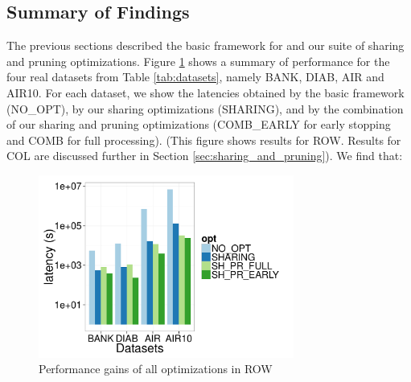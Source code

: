 \subsection{Summary of Findings}
\label{sec:expt_summary}

The previous sections described the basic framework for \SeeDB and our suite of sharing and pruning optimizations.
Figure \ref{fig:share_prune_row} shows a summary of \SeeDB performance for the four real datasets from Table \ref{tab:datasets}, namely BANK, DIAB, AIR and AIR10. 
For each dataset, we show the latencies obtained by the basic \SeeDB framework (NO\_OPT), by our sharing optimizations (SHARING), and by the combination of our sharing and pruning optimizations (COMB\_EARLY for early stopping and COMB for full processing).
(This figure shows results for ROW. Results for COL are discussed further in Section \ref{sec:sharing_and_pruning}).
We find that:

\begin{figure}[h]
	\centering
	\includegraphics[width=8.4cm] {Images/all_opt_real_data_row.pdf}
	\caption{Performance gains of all optimizations in ROW}
	\label{fig:share_prune_row}
	\vspace{-15pt}
\end{figure}

